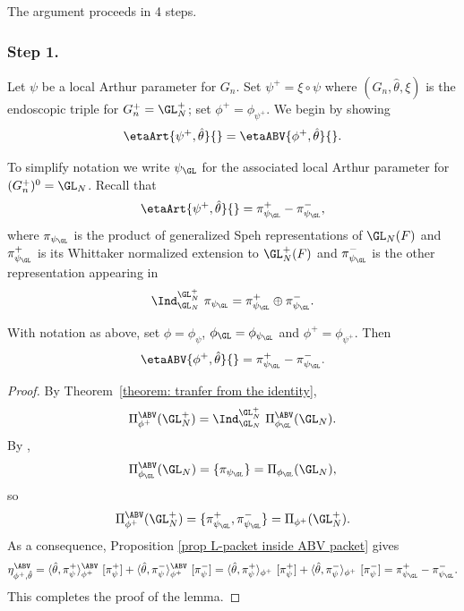 \documentclass[11pt,letterpaper]{amsart}
\numberwithin{equation}{section}
\begin{document}
The argument proceeds in 4 steps.

\subsubsection{\bf Step 1.}

Let $\psi$ be a local Arthur parameter for $G_n$.
Set $\psi^{+} = \xi\circ \psi$ where $(G_n,{\hat\theta},\xi)$ is the endoscopic triple for $G_n^+ = \GL_N^+$; set $\phi^+ = \phi_{\psi^+}$.
We begin by showing
\[
\etaArt{\psi^+,{\hat\theta}}{}
=
\etaABV{\phi^+,{\hat\theta}}{}.
\]

To simplify notation 
we write $\psi_{\GL}$ for the associated local Arthur parameter for $(G_n^+)^0 = \GL_N$.
Recall that
\begin{equation}\label{equation: step 1, a}
\etaArt{\psi^+,{\hat\theta}}{}
=
{\pi_{\psi_\GL}^+} - {\pi_{\psi_\GL}^-},
\end{equation}
where $\pi_{\psi_\GL}$ is the product of generalized Speh representations of $\GL_N(F)$ and $\pi_{\psi_\GL}^+$ is its Whittaker normalized extension to $\GL_N^+(F)$ and $\pi_{\psi_\GL}^-$ is the other representation appearing in 
\[
\Ind_{\GL_N}^{\GL_N^+}
\ \pi_{\psi_\GL} 
= \pi_{\psi_\GL}^+ \oplus \pi_{\psi_\GL}^-.
\]

\begin{lemma}
With notation as above, set $\phi = \phi_{\psi}$, $\phi_{\GL} = \phi_{\psi_{\GL}}$ and $\phi^+ = \phi_{\psi^+}$.
Then
\[
\etaABV{\phi^+,{\hat\theta}}{}
=
{\pi_{\psi_\GL}^+} -{\pi_{\psi_\GL}^-}.
\]
\end{lemma}

\begin{proof}
By Theorem~\ref{theorem: tranfer from the identity}, 
\[
\Pi^\ABV_{\phi^{+}}(\GL_N^+)
=
\Ind_{\GL_N}^{\GL_N^+} \ \Pi^\ABV_{\phi_{\GL}}(\GL_N).
\]
By \cites{CR2, Rid23, Lo24},
\[
\Pi^\ABV_{\phi_{\GL}}(\GL_N) = \{ \pi_{\psi_\GL} \}= \Pi_{\phi_{\GL}}(\GL_N),
\]
so 
\[
\Pi^\ABV_{\phi^{+}}(\GL_N^+) = \{ \pi_{\psi_\GL}^+, \pi_{\psi_\GL}^- \}= \Pi_{\phi^{+}}(\GL_N^+).
\]
As a consequence, Proposition \ref{prop L-packet inside ABV packet} gives
\[ \eta_{\phi^+,\hat{\theta}}^{\ABV}=\langle {\hat\theta}, \pi_\psi^+ \rangle_{\phi^+}^\ABV
 \ [\pi_\psi^+]
 +
 \langle {\hat\theta},
 \pi_\psi^- \rangle_{\phi^+}^\ABV 
 \ [\pi_\psi^-]=\langle {\hat\theta}, \pi_\psi^+ \rangle_{\phi^+}
 \ [\pi_\psi^+]
 +
 \langle {\hat\theta},
 \pi_\psi^- \rangle_{\phi^+} 
 \ [\pi_\psi^-]= \pi_{\psi_{\GL}}^+-\pi_{\psi_{\GL}}^-. \]
This completes the proof of the lemma.
\end{proof}
\end{document}
